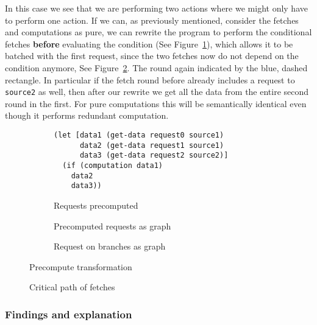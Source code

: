 In this case we see that we are performing two actions where we might only have to perform one action.
If we can, as previously mentioned, consider the fetches and computations as pure, we can rewrite the program to perform the conditional fetches \textbf{before} evaluating the condition (See Figure~\ref{fig:requests-precomputed}), which allows it to be batched with the first request, since the two fetches now do not depend on the condition anymore, See Figure~\ref{fig:requests-precomputed-graph}.
The round again indicated by the blue, dashed rectangle.
In particular if the fetch round before already includes a request to \texttt{source2} as well, then after our rewrite we get all the data from the entire second round in the first.
For pure computations this will be semantically identical even though it performs redundant computation.

\begin{figure}[h]

  \begin{subfigure}{\textwidth}
\begin{verbatim}
(let [data1 (get-data request0 source1)
      data2 (get-data request1 source1)
      data3 (get-data request2 source2)]
  (if (computation data1)
    data2
    data3))
\end{verbatim}
    \caption{Requests precomputed}
    \label{fig:requests-precomputed}
  \end{subfigure}

  \begin{subfigure}{0.7\textwidth}
    \caption{Precomputed requests as graph}
    \label{fig:requests-precomputed-graph}
  \end{subfigure}
  \begin{subfigure}{.7\textwidth}
    \caption{Request on branches as graph}
    \label{fig:requests-on-branches-graph}
  \end{subfigure}
  \caption{Precompute transformation}
\end{figure}

\begin{figure}[h]
    \caption{Critical path of fetches}
    \label{fig:critical-path}
\end{figure}

\subsubsection{Findings and explanation}


